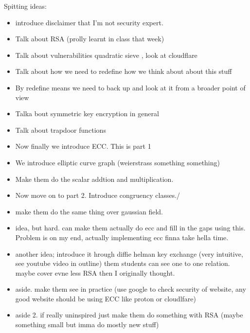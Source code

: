 \documentclass{article}
\begin{document}
\vspace{2mm}






Spitting ideas:

\begin{itemize}
    \item introduce disclaimer that I'm not security expert.
    \item Talk about RSA (prolly learnt in class that week)
    \item Talk about vulnerabilities quadratic sieve , look at cloudflare
    
    \item Talk about how we need to redefine how we think about about this stuff
    \item By redefine means we need to back up and look at it from a broader point of view
    \item Talka bout symmetric key encryption in general
    \item Talk about trapdoor functions


    \item Now finally we introduce ECC. This is part 1
    \item We introduce elliptic curve graph (weierstrass something something)
    \item Make them do the scalar addtion and multiplication.

    \item Now move on to part 2. Introduce congruency classes./
    \item make them do the same thing over gaussian field.

    \item idea, but hard. can make them actually do ecc and fill in the gaps using this. Problem is on my end, actually implementing ecc finna take hella time.
    \item another idea; introduce it hrough diffie helman key exchange (very intuitive, see youtube video in outline) them students can see one to one relation. maybe cover evne less RSA then I originally thought.

    \item aside. make them see in practice (use google to check security of website, any good website should be using ECC like proton or cloudlfare)
    \item aside 2. if really uninspired just make them do something with RSA (maybe something small but imma do mostly new stuff)
\end{itemize}
\end{document}
